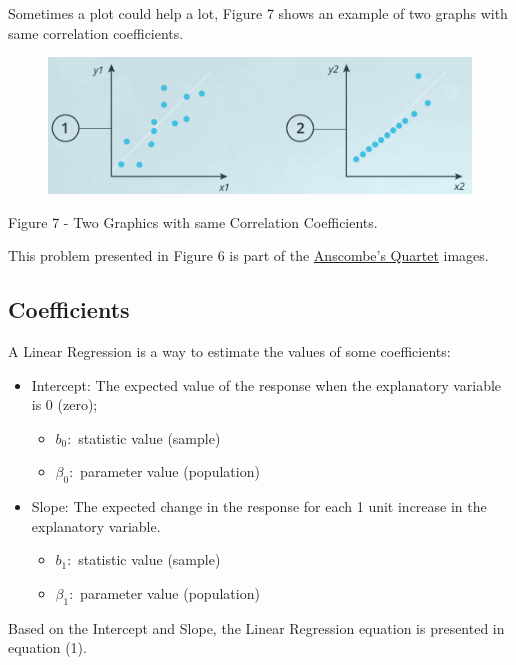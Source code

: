 \documentclass[]{book}
\providecommand{\tightlist}{%
  \setlength{\itemsep}{0pt}\setlength{\parskip}{0pt}}
\begin{document}
Sometimes a plot could help a lot, Figure 7 shows an example of two
graphs with same correlation coefficients.

\begin{figure}
\centering
\includegraphics{01-img/c4_l14_07.png}
\caption{}
\end{figure}

Figure 7 - Two Graphics with same Correlation Coefficients.

This problem presented in Figure 6 is part of the
\href{https://en.wikipedia.org/wiki/Anscombe\%27s_quartet}{Anscombe's
Quartet} images.

\subsection{Coefficients}\label{coefficients}

A Linear Regression is a way to estimate the values of some
coefficients:

\begin{itemize}
\tightlist
\item
  Intercept: The expected value of the response when the explanatory
  variable is 0 (zero);

  \begin{itemize}
  \tightlist
  \item
    \(b_0:\) statistic value (sample)
  \item
    \(\beta_0:\) parameter value (population)
  \end{itemize}
\item
  Slope: The expected change in the response for each 1 unit increase in
  the explanatory variable.

  \begin{itemize}
  \tightlist
  \item
    \(b_1:\) statistic value (sample)
  \item
    \(\beta_1:\) parameter value (population)
  \end{itemize}
\end{itemize}

Based on the Intercept and Slope, the Linear Regression equation is
presented in equation (1).
\end{document}
